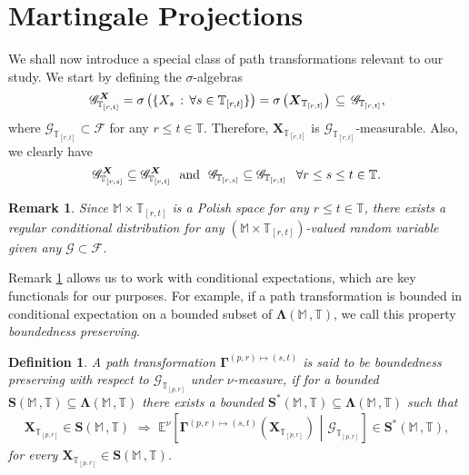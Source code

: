 \documentclass[12pt,a4paper]{article}
\newtheorem{defn}[thm]{Definition}
\newtheorem{rem}[thm]{Remark}
\def\M{\mathbb{M}}
\def\T{\mathbb{T}}
\def\F{\mathscr{F}}
\def\G{\mathscr{G}}
\begin{document}
\section{Martingale Projections}
We shall now introduce a special class of path transformations relevant to our study. We start by defining the $\sigma$-algebras
\begin{align}
\G^{\boldsymbol{X}}_{\T_{[r,t]}} = \sigma\left( \{X_s \, : \, \forall s\in\T_{[r,t]}\} \right) = \sigma\left( \boldsymbol{X}_{\T_{[r,t]}} \right) \, \subseteq \, \G_{\T_{[r,t]}} , \notag
\end{align}
where $\G_{\T_{[r,t]}} \subset \F$ for any $r\leq t\in\T$. Therefore, $\boldsymbol{X}_{\T_{[r,t]}}$ is $\G_{\T_{[r,t]}}$-measurable. Also, we clearly have 
\begin{align}
\G^{\boldsymbol{X}}_{\T_{[r,s]}} \subseteq \G^{\boldsymbol{X}}_{\T_{[r,t]}} \,\,\,\, \text{and} \,\,\,\, \G_{\T_{[r,s]}} \subseteq \G_{\T_{[r,t]}} \hspace{0.1in} \text{$\forall r\leq s\leq t \in \T$.}
\end{align}
%
\begin{rem}
\label{existenceconditionallaw} {\em
Since $\M\times\T_{[r,t]}$ is a Polish space for any $r\leq t\in\T$,  there exists a regular conditional distribution for any $(\M\times\T_{[r,t]})$-valued random variable given any $\G \subset \F$. }
\end{rem}
Remark \ref{existenceconditionallaw} allows us to work with conditional expectations, which are key functionals for our purposes. For example, if a path transformation is bounded in conditional expectation on a bounded subset of $\boldsymbol{\Lambda}(\M \,, \T)$, we call this property \emph{boundedness preserving}. 
%
\begin{defn} {\em
A path transformation $\boldsymbol{\Gamma}^{(p,r)\mapsto(s,t)}$ is said to be boundedness preserving with respect to $\G_{\T_{[p,r]}}$ under $\nu$-measure, if for a bounded $\boldsymbol{S}(\M \,,\T) \subseteq \boldsymbol{\Lambda}(\M \,, \T)$ there exists a bounded $\boldsymbol{S}^*(\M \,, \T) \subseteq \boldsymbol{\Lambda}(\M \,, \T)$ such that
\begin{align}
\boldsymbol{X}_{\T_{[p,r]}} \in \boldsymbol{S}(\M \,, \T) \,\, \Rightarrow \,\, \mathbb{E}^{\nu}\left[\boldsymbol{\Gamma}^{(p,r)\mapsto(s,t)}\left(  \boldsymbol{X}_{\T_{[p,r]}} \right)  \,\, \left| \,\, \G_{\T_{[p,r]}} \right.\right] \in \boldsymbol{S}^*(\M \,, \T), \label{boundednesspreservation}
\end{align}
for every $\boldsymbol{X}_{\T_{[p,r]}} \in \boldsymbol{S}(\M \,, \T)$. }
\end{defn} 
\end{document}
